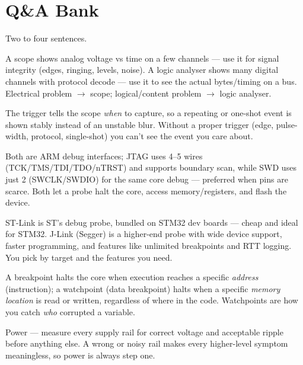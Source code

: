 \section{Q\&A Bank}

%
{Two to four sentences.}

A scope shows analog voltage vs time on a few channels --- use it for signal
integrity (edges, ringing, levels, noise). A logic analyser shows many digital
channels with protocol decode --- use it to see the actual bytes/timing on a bus.
Electrical problem $\rightarrow$ scope; logical/content problem $\rightarrow$
logic analyser.

The trigger tells the scope \emph{when} to capture, so a repeating or one-shot
event is shown stably instead of an unstable blur. Without a proper trigger
(edge, pulse-width, protocol, single-shot) you can't see the event you care
about.

Both are ARM debug interfaces; JTAG uses 4--5 wires (TCK/TMS/TDI/TDO/nTRST) and
supports boundary scan, while SWD uses just 2 (SWCLK/SWDIO) for the same core
debug --- preferred when pins are scarce. Both let a probe halt the core, access
memory/registers, and flash the device.

ST-Link is ST's debug probe, bundled on STM32 dev boards --- cheap and ideal for
STM32. J-Link (Segger) is a higher-end probe with wide device support, faster
programming, and features like unlimited breakpoints and RTT logging. You pick by
target and the features you need.

A breakpoint halts the core when execution reaches a specific \emph{address}
(instruction); a watchpoint (data breakpoint) halts when a specific \emph{memory
location} is read or written, regardless of where in the code. Watchpoints are
how you catch \emph{who} corrupted a variable.

Power --- measure every supply rail for correct voltage and acceptable ripple
before anything else. A wrong or noisy rail makes every higher-level symptom
meaningless, so power is always step one.

